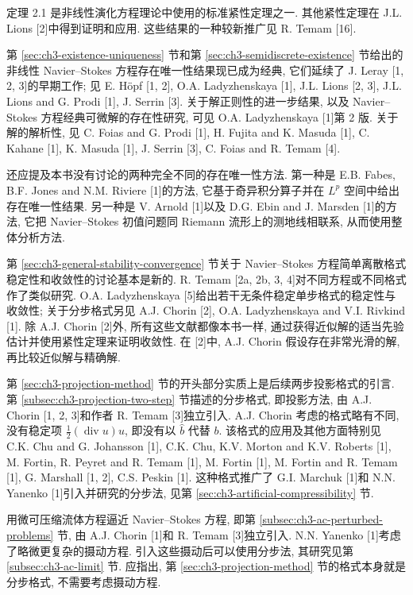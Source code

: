 定理 2.1 是非线性演化方程理论中使用的标准紧性定理之一. 其他紧性定理在 J.L. Lions [2]中得到证明和应用. 这些结果的一种较新推广见 R. Temam [16].

\hypertarget{comments-page-399}{}
第 \ref{sec:ch3-existence-uniqueness} 节和第 \ref{sec:ch3-semidiscrete-existence} 节给出的非线性 Navier--Stokes 方程存在唯一性结果现已成为经典, 它们延续了 J. Leray [1, 2, 3]的早期工作; 见 E. Höpf [1, 2], O.A. Ladyzhenskaya [1], J.L. Lions [2, 3], J.L. Lions and G. Prodi [1], J. Serrin [3]. 关于解正则性的进一步结果, 以及 Navier--Stokes 方程经典可微解的存在性研究, 可见 O.A. Ladyzhenskaya [1]第 2 版. 关于解的解析性, 见 C. Foias and G. Prodi [1], H. Fujita and K. Masuda [1], C. Kahane [1], K. Masuda [1], J. Serrin [3], C. Foias and R. Temam [4].

还应提及本书没有讨论的两种完全不同的存在唯一性方法. 第一种是 E.B. Fabes, B.F. Jones and N.M. Riviere [1]的方法, 它基于奇异积分算子并在 $L^p$ 空间中给出存在唯一性结果. 另一种是 V. Arnold [1]以及 D.G. Ebin and J. Marsden [1]的方法, 它把 Navier--Stokes 初值问题同 Riemann 流形上的测地线相联系, 从而使用整体分析方法.

第 \ref{sec:ch3-general-stability-convergence} 节关于 Navier--Stokes 方程简单离散格式稳定性和收敛性的讨论基本是新的. R. Temam [2a, 2b, 3, 4]对不同方程或不同格式作了类似研究. O.A. Ladyzhenskaya [5]给出若干无条件稳定单步格式的稳定性与收敛性; 关于分步格式另见 A.J. Chorin [2], O.A. Ladyzhenskaya and V.I. Rivkind [1]. 除 A.J. Chorin [2]外, 所有这些文献都像本书一样, 通过获得近似解的适当先验估计并使用紧性定理来证明收敛性. 在 [2]中, A.J. Chorin 假设存在非常光滑的解, 再比较近似解与精确解.

第 \ref{sec:ch3-projection-method} 节的开头部分实质上是后续两步投影格式的引言. 第 \ref{subsec:ch3-projection-two-step} 节描述的分步格式, 即投影方法, 由 A.J. Chorin [1, 2, 3]和作者 R. Temam [3]独立引入. A.J. Chorin 考虑的格式略有不同, 没有稳定项 $\frac12(\operatorname{div}u)u$, 即没有以 $\widehat b$ 代替 $b$. 该格式的应用及其他方面特别见 C.K. Chu and G. Johansson [1], C.K. Chu, K.V. Morton and K.V. Roberts [1], M. Fortin, R. Peyret and R. Temam [1], M. Fortin [1], M. Fortin and R. Temam [1], G. Marshall [1, 2], C.S. Peskin [1]. 这种格式推广了 G.I. Marchuk [1]和 N.N. Yanenko [1]引入并研究的分步法, 见第 \ref{sec:ch3-artificial-compressibility} 节.

用微可压缩流体方程逼近 Navier--Stokes 方程, 即第 \ref{subsec:ch3-ac-perturbed-problems} 节, 由 A.J. Chorin [1]和 R. Temam [3]独立引入. N.N. Yanenko [1]考虑了略微更复杂的摄动方程. 引入这些摄动后可以使用分步法, 其研究见第 \ref{subsec:ch3-ac-limit} 节. 应指出, 第 \ref{sec:ch3-projection-method} 节的格式本身就是分步格式, 不需要考虑摄动方程.

